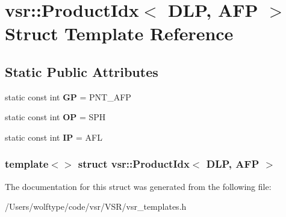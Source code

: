 \hypertarget{structvsr_1_1_product_idx_3_01_d_l_p_00_01_a_f_p_01_4}{\section{vsr\-:\-:Product\-Idx$<$ D\-L\-P, A\-F\-P $>$ Struct Template Reference}
\label{structvsr_1_1_product_idx_3_01_d_l_p_00_01_a_f_p_01_4}
}
\subsection*{Static Public Attributes}
\begin{DoxyCompactItemize}
\item 
\hypertarget{structvsr_1_1_product_idx_3_01_d_l_p_00_01_a_f_p_01_4_a77eb862de278875cf610b053afc66178}{static const int {\bfseries G\-P} = P\-N\-T\-\_\-\-A\-F\-P}\label{structvsr_1_1_product_idx_3_01_d_l_p_00_01_a_f_p_01_4_a77eb862de278875cf610b053afc66178}

\item 
\hypertarget{structvsr_1_1_product_idx_3_01_d_l_p_00_01_a_f_p_01_4_a6401996a535d2f46fcfc885d0102b7a7}{static const int {\bfseries O\-P} = S\-P\-H}\label{structvsr_1_1_product_idx_3_01_d_l_p_00_01_a_f_p_01_4_a6401996a535d2f46fcfc885d0102b7a7}

\item 
\hypertarget{structvsr_1_1_product_idx_3_01_d_l_p_00_01_a_f_p_01_4_a6b8ec628e91ae13885f8bdac342a5e75}{static const int {\bfseries I\-P} = A\-F\-L}\label{structvsr_1_1_product_idx_3_01_d_l_p_00_01_a_f_p_01_4_a6b8ec628e91ae13885f8bdac342a5e75}

\end{DoxyCompactItemize}
\subsubsection*{template$<$$>$ struct vsr\-::\-Product\-Idx$<$ D\-L\-P, A\-F\-P $>$}



The documentation for this struct was generated from the following file\-:\begin{DoxyCompactItemize}
\item 
/\-Users/wolftype/code/vsr/\-V\-S\-R/vsr\-\_\-templates.\-h\end{DoxyCompactItemize}
